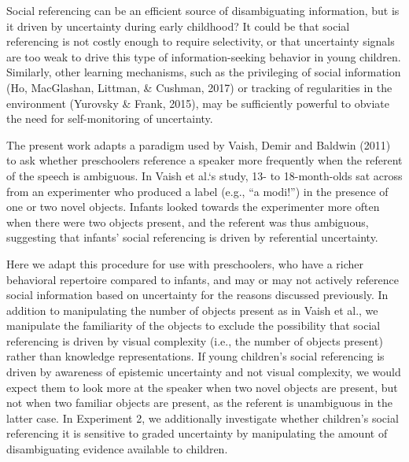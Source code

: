 \documentclass[10pt, letterpaper]{article}
\begin{document}
Social referencing can be an efficient source of disambiguating
information, but is it driven by uncertainty during early childhood? It
could be that social referencing is not costly enough to require
selectivity, or that uncertainty signals are too weak to drive this type
of information-seeking behavior in young children. Similarly, other
learning mechanisms, such as the privileging of social information (Ho,
MacGlashan, Littman, \& Cushman, 2017) or tracking of regularities in
the environment (Yurovsky \& Frank, 2015), may be sufficiently powerful
to obviate the need for self-monitoring of uncertainty.

The present work adapts a paradigm used by Vaish, Demir and Baldwin
(2011) to ask whether preschoolers reference a speaker more frequently
when the referent of the speech is ambiguous. In Vaish et al.`s study,
13- to 18-month-olds sat across from an experimenter who produced a
label (e.g., ``a modi!'') in the presence of one or two novel objects.
Infants looked towards the experimenter more often when there were two
objects present, and the referent was thus ambiguous, suggesting that
infants' social referencing is driven by referential uncertainty.

Here we adapt this procedure for use with preschoolers, who have a
richer behavioral repertoire compared to infants, and may or may not
actively reference social information based on uncertainty for the
reasons discussed previously. In addition to manipulating the number of
objects present as in Vaish et al., we manipulate the familiarity of the
objects to exclude the possibility that social referencing is driven by
visual complexity (i.e., the number of objects present) rather than
knowledge representations. If young children's social referencing is
driven by awareness of epistemic uncertainty and not visual complexity,
we would expect them to look more at the speaker when two novel objects
are present, but not when two familiar objects are present, as the
referent is unambiguous in the latter case. In Experiment 2, we
additionally investigate whether children's social referencing it is
sensitive to graded uncertainty by manipulating the amount of
disambiguating evidence available to children.
\end{document}
